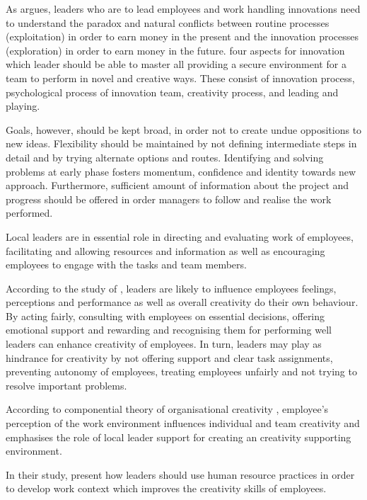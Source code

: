 As \citet{buijs2007innovation} argues, leaders who are to lead employees and work handling innovations need to understand the paradox and natural conflicts between routine processes (exploitation) in order to earn money in the present and the innovation processes (exploration) in order to earn money in the future. \citet{buijs2007innovation} four aspects for innovation which leader should be able to master all providing a secure environment for a team to perform in novel and creative ways. These consist of innovation process, psychological process of innovation team, creativity process, and leading and playing. 

Goals, however, should be kept broad, in order not to create undue oppositions to new ideas. Flexibility should be maintained by not defining intermediate steps in detail and by trying alternate options and routes. Identifying and solving problems at early phase fosters momentum, confidence and identity towards new approach. Furthermore, sufficient amount of information about the project and progress should be offered in order managers to follow and realise the work performed.  \citep{quinn1985managing}

Local leaders are in essential role in directing and evaluating work of employees, facilitating and allowing resources and information as well as encouraging employees to engage with the tasks and team members. \citep{amabile2004leader}

According to the study of \citet{amabile2004leader}, leaders are likely to influence employees feelings, perceptions and performance as well as overall creativity do their own behaviour. By acting fairly, consulting with employees on essential decisions, offering emotional support and rewarding and recognising them for performing well leaders can enhance creativity of employees. In turn, leaders may play as hindrance for creativity by not offering support and clear task assignments, preventing autonomy of employees, treating employees unfairly and not trying to resolve important problems. 

According to componential theory of organisational creativity \citep{hennessey19881,amabile1996assessing}, employee's perception of the work environment influences individual and team creativity and emphasises the role of local leader support for creating an creativity supporting environment. 

In their study, \citet{shalley2004leaders} present how leaders should use human resource practices in order to develop work context which improves the creativity skills of employees. 

